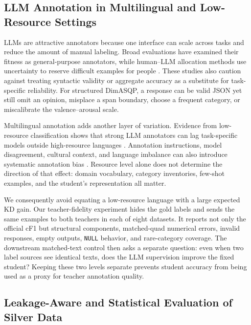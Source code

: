 \subsection{LLM Annotation in Multilingual and Low-Resource
Settings}\label{llm-annotation-in-multilingual-and-low-resource-settings}

LLMs are attractive annotators because one interface can scale across
tasks and reduce the amount of manual labeling. Broad evaluations have
examined their fitness as general-purpose annotators, while human--LLM
allocation methods use uncertainty to reserve difficult examples for
people \citep{ding2023annotator,li2023coannotating}. These studies also
caution against treating syntactic validity or aggregate accuracy as a
substitute for task-specific reliability. For structured DimASQP, a
response can be valid JSON yet still omit an opinion, misplace a span
boundary, choose a frequent category, or miscalibrate the
valence--arousal scale.

Multilingual annotation adds another layer of variation. Evidence from
low-resource classification shows that strong LLM annotators can lag
task-specific models outside high-resource languages
\citep{jadhav2025limitations}. Annotation instructions, model
disagreement, cultural context, and language imbalance can also
introduce systematic annotation bias \citep{cui2025bias}. Resource level
alone does not determine the direction of that effect: domain
vocabulary, category inventories, few-shot examples, and the student's
representation all matter.

We consequently avoid equating a low-resource language with a large
expected KD gain. Our teacher-fidelity experiment hides the gold labels
and sends the same examples to both teachers in each of eight datasets.
It reports not only the official cF1 but structural components,
matched-quad numerical errors, invalid responses, empty outputs,
\texttt{NULL} behavior, and rare-category coverage. The downstream
matched-text control then asks a separate question: even when two label
sources see identical texts, does the LLM supervision improve the fixed
student? Keeping these two levels separate prevents student accuracy
from being used as a proxy for teacher annotation quality.

\subsection{Leakage-Aware and Statistical Evaluation of Silver
Data}\label{leakage-aware-and-statistical-evaluation-of-silver-data}

